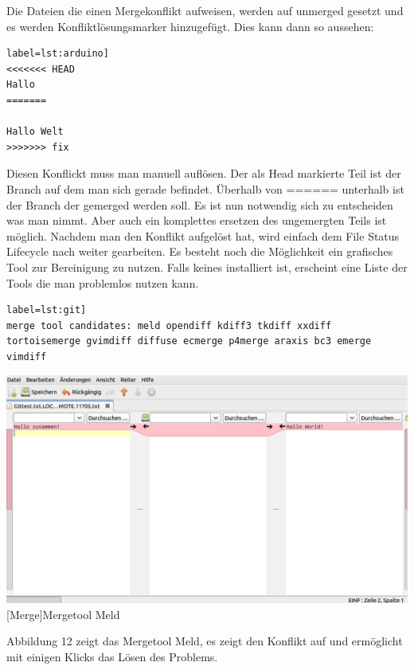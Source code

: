 \documentclass[12pt,a4paper,bibliography=totocnumbered,listof=totocnumbered]{scrartcl}
\begin{document}
Die Dateien die einen Mergekonflikt aufweisen, werden auf unmerged gesetzt und es werden Konfliktlösungsmarker hinzugefügt. Dies kann dann so aussehen:  	

\begin{lstlisting}[caption=Branch Konfilkt] label=lst:arduino]
<<<<<<< HEAD
Hallo
=======

Hallo Welt
>>>>>>> fix
\end{lstlisting}

Diesen Konflickt muss man manuell auflösen. Der als Head markierte Teil ist der Branch auf dem man sich gerade befindet. Überhalb von ====== unterhalb ist der Branch der gemerged werden soll. Es ist nun notwendig sich zu entscheiden was man nimmt. Aber auch ein komplettes ersetzen des ungemergten Teils ist möglich. Nachdem man den Konflikt aufgelöst hat, wird einfach dem File Status Lifecycle nach weiter gearbeiten.
Es besteht noch die Möglichkeit ein grafisches Tool zur Bereinigung zu nutzen. Falls keines installiert ist, erscheint eine Liste der Tools die man problemlos nutzen kann.
\begin{lstlisting}[caption=Merge Tools] label=lst:git]
merge tool candidates: meld opendiff kdiff3 tkdiff xxdiff tortoisemerge gvimdiff diffuse ecmerge p4merge araxis bc3 emerge vimdiff
\end{lstlisting}

\vspace{1em}
\begin{minipage}{\linewidth}
	\centering
	\includegraphics[width=0.6\linewidth]{Bilder/mergetool.png}
	[Merge]{Mergetool Meld\footnotemark }
	\label{Mergetool Meld}
\end{minipage}

Abbildung 12 zeigt das Mergetool Meld, es zeigt den  Konflikt auf und ermöglicht mit einigen Klicks das Lösen des Problems.
\end{document}
